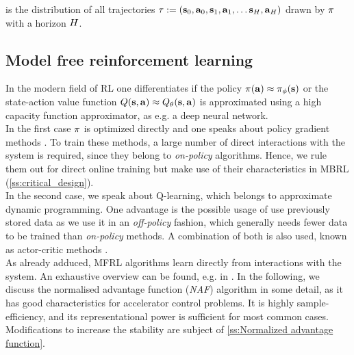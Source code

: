 \documentclass[
reprint,
amsmath,amssymb,amsfonts,clevref,
aps,
prstab,
]{revtex4-2}
\begin{document}
	is the distribution of all trajectories $\tau := (\mathbf{s}_0, \mathbf{a}_0, \mathbf{s}_1, \mathbf{a}_1,\dots \mathbf{s}_H,\mathbf{a}_H)$ drawn by $\pi$ with a horizon $H$.
	
	\subsection{Model free reinforcement learning}\label{s:Model-free reinforcement learning}
	In the modern field of RL one differentiates if the policy $\pi(\mathbf{a})\approx \pi_\phi(\mathbf{s})$ or the state-action value function $Q(\mathbf{s},\mathbf{a}) \approx Q_\theta(\mathbf{s},\mathbf{a})$ is approximated using a high capacity function approximator, as e.g. a deep neural network.\\
	In the first case $\pi$ is optimized directly and one speaks about policy gradient methods \cite{Sutton2018, Williams1992,Baxter2011,pmlr-v28-levine13, Schulman2015,Schulman2017}. To train these methods, a large number of direct interactions with the system is required, since they belong to \emph{on-policy} algorithms. Hence, we rule them out for direct online training but make use of their characteristics in MBRL (\cref{ss:critical_design}).\\
	In the second case, we speak about Q-learning, which belongs to approximate dynamic programming. One advantage is the possible usage of use previously stored data as we use it in an \emph{off-policy} fashion, which generally needs fewer data to be trained than \emph{on-policy} methods. A combination of both is also used, known as actor-critic methods \cite{Szepesvari2010,Lillicrap2015,Silver2014}.\\
	As already adduced, MFRL algorithms learn directly from interactions with the system. An exhaustive overview can be found, e.g. in \cite{Sutton2018,Levine2020}. In the following, we discuss the normalised advantage function (\emph{NAF}) algorithm \cite{Gu2016} in some detail, as it has good characteristics for accelerator control problems. It is highly sample-efficiency, and its representational power is sufficient for most common cases\cite{Kain2020,Hirlaender2020a}. Modifications to increase the stability are subject of \cref{ss:Normalized advantage function}.
\end{document}
